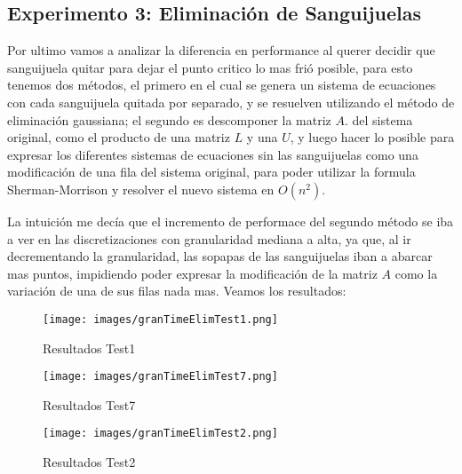 \documentclass[a4paper]{article}
\begin{document}
\subsection{Experimento 3: Eliminación de Sanguijuelas}
Por ultimo vamos a analizar la diferencia en performance al querer decidir que sanguijuela quitar para dejar el punto critico lo mas frió posible, para esto tenemos dos métodos, el primero en el cual se genera un sistema de ecuaciones con cada sanguijuela quitada por separado, y se resuelven utilizando el método de eliminación gaussiana; el segundo es descomponer la matriz $A$. del sistema original, como el producto de una matriz $L$ y una $U$, y luego hacer lo posible para expresar los diferentes sistemas de ecuaciones sin las sanguijuelas como una modificación de una fila del sistema original, para poder utilizar la formula Sherman-Morrison y resolver el nuevo sistema en $O(n^2)$.

La intuición me decía que el incremento de performace del segundo método se iba a ver en las discretizaciones con granularidad mediana a alta, ya que, al ir decrementando la granularidad, las sopapas de las sanguijuelas iban a abarcar mas puntos, impidiendo poder expresar la modificación de la matriz $A$ como la variación de una de sus filas nada mas. Veamos los resultados:

\begin{minipage}[t]{0.45\linewidth}
  \begin{figure}[H]
  \centering
  \texttt{[image: images/granTimeElimTest1.png]}
  \caption{Resultados Test1}
  \label{exp1plot}
  \end{figure}
\end{minipage}%
\hfill
\begin{minipage}[t]{0.45\linewidth}
 \centering
     \begin{figure}[H]
    \centering
    \texttt{[image: images/granTimeElimTest7.png]}
    \caption{Resultados Test7}
    \label{exp1plot}
    \end{figure}
\end{minipage}
\begin{center}
\begin{minipage}[t]{0.45\linewidth}
\begin{figure}[H]
\centering
\texttt{[image: images/granTimeElimTest2.png]}
\caption{Resultados Test2}
\label{exp1plot}
\end{figure}
\end{minipage}%
\end{center}
\end{document}
